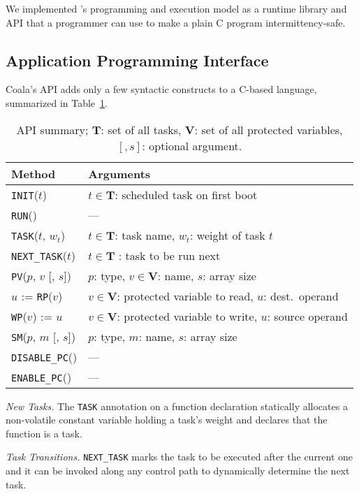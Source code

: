 We implemented \sys's programming and execution model as a runtime library and API that a programmer can use to make a plain C program intermittency-safe.
%
\subsection{Application Programming Interface}
\label{sec:coala_api}
%
Coala's API adds only a few syntactic constructs to a C-based language, summarized
in Table~\ref{table:coala_api}.
%
\begin{table}%
\caption{API summary; $\mathbf{T}$: set of all tasks, $\mathbf{V}$: set of all protected variables, $[, s]$: optional argument.}
\begin{minipage}{\columnwidth}
\begin{center}
\begin{tabular}{ll}
  \toprule
	{Method} & {Arguments} \\
	\hline
	\texttt{INIT}($t$) & $t \in \mathbf{T}$: scheduled task on first boot \\
	\texttt{RUN}() & --- \\
	\texttt{TASK}($t$, $w_t$) & $t \in \mathbf{T}$: task name, $w_t$: weight of task $t$ \\
	\texttt{NEXT\_TASK}($t$) & $t \in \mathbf{T}$ : task to be run next \\
	\texttt{PV}($p$, $v$ [, $s$]) & $p$: type, $v \in \mathbf{V}$: name, $s$: array size \\
	$u$ := \texttt{RP}($v$) & $v \in \mathbf{V}$: protected variable to read, $u$: dest.\ operand \\
	\texttt{WP}($v$) := $u$ &  $v \in \mathbf{V}$: protected variable to write, $u$: source operand \\
	\texttt{SM}($p$, $m$ [, $s$]) & $p$: type, $m$: name, $s$: array size \\
	\texttt{DISABLE\_PC}() & --- \\
	\texttt{ENABLE\_PC}() & --- \\
  \bottomrule
\end{tabular}
\label{table:coala_api}
\end{center}
\end{minipage}
\end{table}%

\noindent\textit{New Tasks.} The \texttt{TASK} annotation on a function
declaration statically allocates a non-volatile constant variable holding a
task's weight and declares that the function is a task.

\noindent\textit{Task Transitions.} \texttt{NEXT\_TASK} marks the task to be executed after the current one and it can be invoked along
any control path to dynamically determine the next task.

